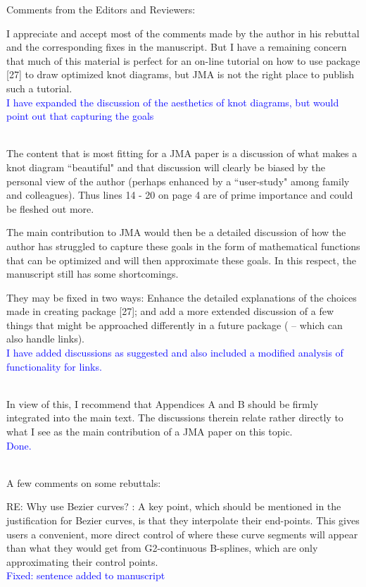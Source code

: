 \documentclass[12pt]{article}
\begin{document}
Comments from the Editors and Reviewers:

I appreciate and accept most of the comments made by the author in his
rebuttal and the corresponding fixes in the manuscript.  But I have a
remaining concern that much of this material is perfect for an on-line
tutorial on how to use package [27] to draw optimized knot diagrams,
but JMA is not the right place to publish such a
tutorial.\textcolor{blue}{\\I have expanded the discussion of the
  aesthetics of knot diagrams, but would point out that capturing the
  goals\\ \\}

The content that is most fitting for a JMA paper is a discussion of
what makes a knot diagram ``beautiful" and that discussion will
clearly be biased by the personal view of the author (perhaps enhanced
by a ``user-study" among family and colleagues).  Thus lines 14 - 20
on page 4 are of prime importance and could be fleshed out more.

The main contribution to JMA would then be a detailed discussion of
how the author has struggled to capture these goals in the form of
mathematical functions that can be optimized and will then approximate
these goals.  In this respect, the manuscript still has some
shortcomings.

They may be fixed in two ways: Enhance the detailed explanations of
the choices made in creating package [27]; and add a more extended
discussion of a few things that might be approached differently in a
future package ( -- which can also handle links).
\textcolor{blue}{\\I have added discussions as suggested and also
  included a modified analysis of functionality for links.\\ \\}

In view of this, I recommend that Appendices A and B should be firmly
integrated into the main text.  The discussions therein relate rather
directly to what I see as the main contribution of a JMA paper on this
topic.\textcolor{blue}{\\Done.\\ \\}

A few comments on some rebuttals:

RE: Why use Bezier curves? : A key point, which should be mentioned in
the justification for Bezier curves, is that they interpolate their
end-points. This gives users a convenient, more direct control of
where these curve segments will appear than what they would get from
G2-continuous B-splines, which are only approximating their control
points.\textcolor{blue}{\\Fixed: sentence added to manuscript\\ \\}
\end{document}

